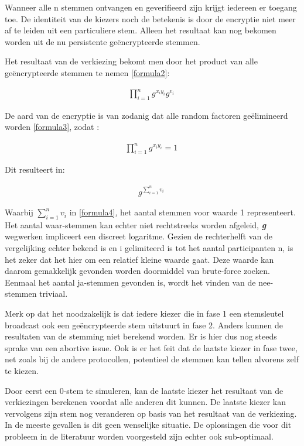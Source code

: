 			Wanneer alle n stemmen ontvangen en geverifieerd zijn krijgt iedereen er toegang toe. De identiteit van de kiezers noch de betekenis is door de encryptie niet meer af te leiden uit een particuliere stem. Alleen het resultaat kan nog bekomen worden uit de nu persistente geëncrypteerde stemmen.
			
			Het resultaat van de verkiezing bekomt men door het product van alle geëncrypteerde stemmen te nemen \eqref{formula2}: 	
			\begin{ceqn}
				\begin{align}
				\prod_{i=1}^{n}g^{x_{i}y_{i}}g^{v_{i}} \label{formula2}\
				\end{align}
			\end{ceqn}	
			De aard van de encryptie is van zodanig dat alle random factoren geëlimineerd worden \eqref{formula3}, zodat :	
			\begin{ceqn}
				\begin{align}
				\prod_{i=1}^{n}g^{x_{i}y_{i}} = 1 \label{formula3}\
				\end{align}
			\end{ceqn}
			Dit resulteert in:
			\begin{ceqn}
				\begin{align}
				g^{\sum_{i=1}^{n}v_{i}} \label{formula4}\
				\end{align}
			\end{ceqn}
			Waarbij \textbf{\textit{$\sum_{i=1}^{n}v_{i}$}} in \eqref{formula4}, het aantal stemmen voor waarde 1 representeert. Het aantal waar-stemmen kan echter niet rechtstreeks worden afgeleid, \textbf{\textit{g}}  wegwerken impliceert een discreet logaritme. Gezien de rechterhelft van de vergelijking echter bekend is en i gelimiteerd is tot het aantal participanten n, is het zeker dat het hier om een relatief kleine waarde gaat. Deze waarde kan daarom gemakkelijk gevonden worden doormiddel van brute-force zoeken. Eenmaal het aantal ja-stemmen gevonden is, wordt het vinden van de nee-stemmen triviaal.
			
			Merk op dat het noodzakelijk is dat iedere kiezer die in fase 1 een stemsleutel broadcast ook een geëncrypteerde stem uitstuurt in fase 2. Anders kunnen de resultaten van de stemming niet berekend worden. Er is hier dus nog steeds sprake van een abortive issue.
			Ook is er het feit dat de laatste kiezer in fase twee, net zoals bij de andere protocollen, potentieel de stemmen kan tellen alvorens zelf te kiezen. 
			
			Door eerst een 0-stem te simuleren, kan de laatste kiezer het resultaat van de verkiezingen berekenen voordat alle anderen dit kunnen. De laatste kiezer kan vervolgens zijn stem nog veranderen op basis van het resultaat van de verkiezing. In de meeste gevallen is dit geen wenselijke situatie. De oplossingen die voor dit probleem in de literatuur worden voorgesteld zijn echter ook sub-optimaal. 
			
